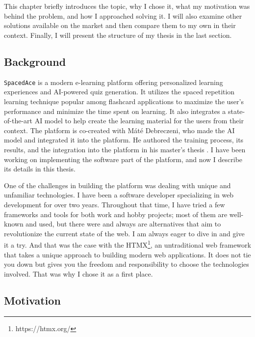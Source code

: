 \chapter{\bevezetes}

This chapter briefly introduces the topic, why I chose it, what my motivation was behind the problem, and how I approached solving it. I will also examine other solutions available on the market and then compare them to my own in their context. Finally, I will present the structure of my thesis in the last section.

\section{Background}

\texttt{SpacedAce} is a modern e-learning platform offering personalized learning experiences and AI-powered quiz generation. It utilizes the spaced repetition learning technique popular among flashcard applications to maximize the user's performance and minimize the time spent on learning. It also integrates a state-of-the-art AI model to help create the learning material for the users from their context. The platform is co-created with Máté Debreczeni, who made the AI model and integrated it into the platform. He authored the training process, its results, and the integration into the platform in his master's thesis . I have been working on implementing the software part of the platform, and now I describe its details in this thesis.

One of the challenges in building the platform was dealing with unique and unfamiliar technologies. I have been a software developer specializing in web development for over two years. Throughout that time, I have tried a few frameworks and tools for both work and hobby projects; most of them are well-known and used, but there were and always are alternatives that aim to revolutionize the current state of the web. I am always eager to dive in and give it a try. And that was the case with the HTMX\footnote{https://htmx.org/}, an untraditional web framework that takes a unique approach to building modern web applications. It does not tie you down but gives you the freedom and responsibility to choose the technologies involved. That was why I chose it as a first place.

\section{Motivation}

